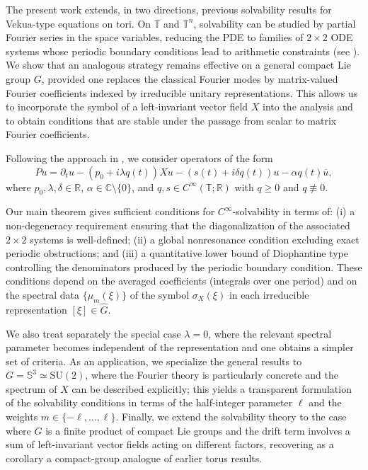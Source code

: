 \documentclass[11pt,reqno]{amsart}
\numberwithin{equation}{section}
\begin{document}
The present work extends, in two directions, previous solvability results for Vekua-type equations on tori. On $\mathbb{T}$ and $\mathbb{T}^n$, solvability can be studied by partial Fourier series in the space variables, reducing the PDE to families of $2\times2$ ODE systems whose periodic boundary conditions lead to arithmetic constraints (see \cite{BDM,AD,KMT24indag,KMT25ZAA,wagner}). We show that an analogous strategy remains effective on a general compact Lie group $G$, provided one replaces the classical Fourier modes by matrix-valued Fourier coefficients indexed by irreducible unitary representations. This allows us to incorporate the symbol of a left-invariant vector field $X$ into the analysis and to obtain conditions that are stable under the passage from scalar to matrix Fourier coefficients.

Following the approach in \cite{BDM}, we consider operators of the form
\[
Pu=\partial_tu-(p_0+i\lambda q(t))Xu-(s(t)+i\delta q(t))u-\alpha q(t)\overline{u},
\]
where $p_0,\lambda,\delta\in\mathbb{R}$, $\alpha\in\mathbb{C}\setminus\{0\}$, and $q,s\in C^\infty(\mathbb{T};\mathbb{R})$ with $q\ge 0$ and $q\not\equiv 0$. 

Our main theorem gives sufficient conditions for $C^\infty$-solvability in terms of: (i) a non-degeneracy requirement ensuring that the diagonalization of the associated $2\times2$ systems is well-defined; (ii) a global nonresonance condition excluding exact periodic obstructions; and (iii) a quantitative lower bound of Diophantine type controlling the denominators produced by the periodic boundary condition. These conditions depend on the averaged coefficients (integrals over one period) and on the spectral data $\{\mu_m(\xi)\}$ of the symbol $\sigma_X(\xi)$ in each irreducible representation $[\xi]\in\widehat{G}$.

We also treat separately the special case $\lambda=0$, where the relevant spectral parameter becomes independent of the representation and one obtains a simpler set of criteria. As an application, we specialize the general results to $G=\mathbb{S}^3\simeq\mathrm{SU}(2)$, where the Fourier theory is particularly concrete and the spectrum of $X$ can be described explicitly; this yields a transparent formulation of the solvability conditions in terms of the half-integer parameter $\ell$ and the weights $m\in\{-\ell,\dots,\ell\}$. Finally, we extend the solvability theory to the case where $G$ is a finite product of compact Lie groups and the drift term involves a sum of left-invariant vector fields acting on different factors, recovering as a corollary a compact-group analogue of earlier torus results.
\end{document}
